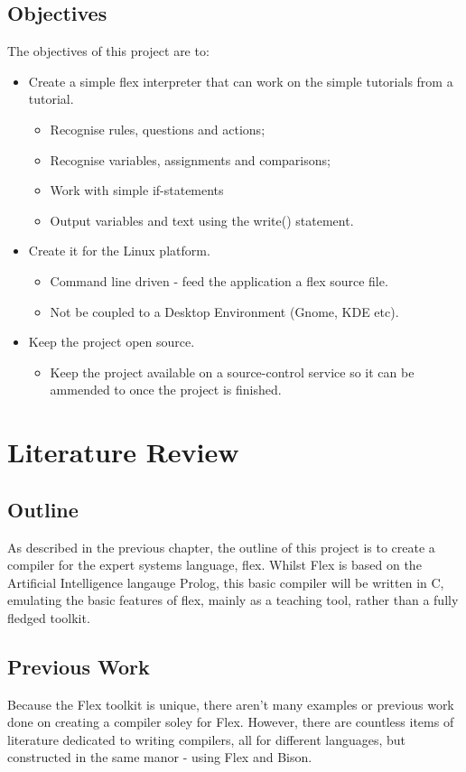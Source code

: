 \documentclass[12pt]{report}
\begin{document}
\section{Objectives}\label{sec:objectives}
The objectives of this project are to:
\begin{itemize}
\item Create a simple flex interpreter that can work on the simple tutorials from a tutorial.
	\begin{itemize}
	\item Recognise rules, questions and actions;
	\item Recognise variables, assignments and comparisons;
	\item Work with simple if-statements
	\item Output variables and text using the write() statement.
	\end{itemize}
\item Create it for the Linux platform.
	\begin{itemize}
	\item Command line driven - feed the application a flex source file.
	\item Not be coupled to a Desktop Environment (Gnome, KDE etc).
	\end{itemize}
\item Keep the project open source.
	\begin{itemize}
	\item Keep the project available on a source-control service so it can be ammended to once the project is finished.
	\end{itemize}
\end{itemize}

\chapter{Literature Review}
\section{Outline}\label{sec:outline}
As described in the previous chapter, the outline of this project is to create a compiler for the expert systems language, flex.  Whilst Flex is based on the Artificial Intelligence langauge Prolog, this basic compiler will be written in C, emulating the basic features of flex, mainly as a teaching tool, rather than a fully fledged toolkit.

\section{Previous Work}\label{sec:previous_work}
Because the Flex toolkit is unique, there aren't many examples or previous work done on creating a compiler soley for Flex.  However, there are countless items of literature dedicated to writing compilers, all for different languages, but constructed in the same manor - using Flex and Bison.
\end{document}
